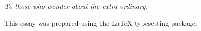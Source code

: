 
\begin {flushright}
\null {}
\textit{
To those who wonder about the extra-ordinary.
}
\null

This essay was prepared using the \LaTeX{} typesetting package.

\end {flushright}


